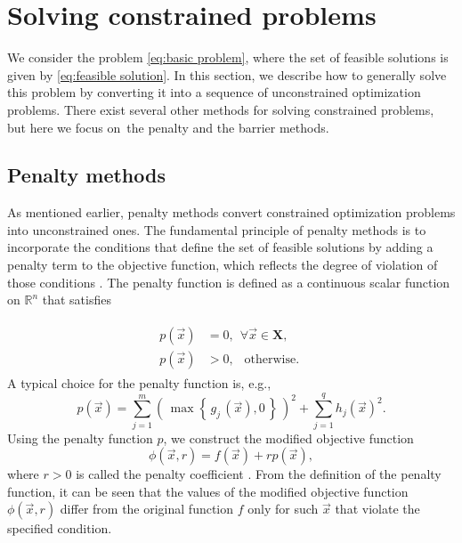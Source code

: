 \section{Solving constrained problems}\label{constrained}
We consider the problem \ref{eq:basic problem}, where the set of feasible solutions is given by \ref{eq:feasible solution}. In this section, we describe how to generally solve this problem by converting it into a sequence of unconstrained optimization problems. There exist several other methods for solving constrained problems, but here we focus on~the penalty and the barrier methods.

\subsection{Penalty methods}\label{penalty method}
As mentioned earlier, penalty methods convert constrained optimization problems into unconstrained ones. The fundamental principle of penalty methods is to incorporate the conditions that define the set of feasible solutions by adding a penalty term to the objective function, which reflects the degree of violation of those conditions \cite{Bert}. The penalty function is defined as a continuous scalar function on $ \mathbb{R}^n $ that satisfies

\begin{align}
	\begin{split}
		p(\vec{x}) &= 0, \ \ \forall \vec{x} \in \mathbf{X},\\[6pt]
		p(\vec{x}) &> 0, \ \ \text { otherwise. }
	\end{split}
\end{align}
A typical choice for the penalty function is, e.g.,
\begin{equation}\label{eq:penalty function}
	p (\vec{x}) = \sum_{j=1}^{m} \left( \, \max  \left\{ \, g_j \, (\vec{x}), 0 \, \right\} \, \right)^2 + \sum_{j=1}^{q} h_j (\vec{x})^2.
\end{equation}
Using the penalty function $ p $, we construct the modified objective function
\begin{equation}\label{eq:cost function with penalty}
	\phi (\vec{x}, r) = f (\vec{x}) + r p(\vec{x}),
\end{equation}
where $ r > 0 $ is called the penalty coefficient \cite{Bert}. From the definition of the penalty function, it can be seen that the values of the modified objective function $ \phi (\vec{x}, r)$ differ from the original function $ f $ only for such $ \vec{x} $ that violate the specified condition.

